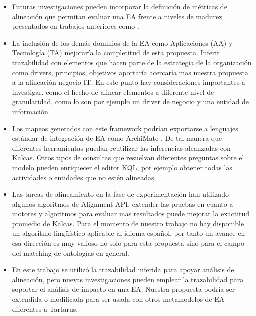 \begin{itemize}

\item Futuras investigaciones pueden incorporar la definici\'on de m\'etricas de alineaci\'on que permitan evaluar una EA frente a niveles de madurez presentados en trabajos anteriores como \cite{Elhari:2011}.

\item La inclusi\'on de los dem\'as dominios de la EA como Aplicaciones (AA) y Tecnolog\'ia (TA) mejorar\'ia la completitud de esta propuesta. Inferir trazabilidad con elementos que hacen parte de la estrategia de la organizaci\'on como drivers, principios, objetivos aportar\'ia acercar\'ia mas nuestra propuesta a la alineaci\'on negocio-IT. En este punto hay consideraciones importantes a investigar, como el hecho de alinear elementos a diferente nivel de granularidad, como lo son por ejemplo un driver de negocio y una entidad de informaci\'on.

\item Los mapeos generados con este framework podr\'ian exportarse a lenguajes est\'andar de integraci\'on de EA como ArchiMate \cite{Jonkers:2004}. De tal manera que diferentes herramientas puedan reutilizar las inferencias alcanzadas con Kalcas. Otros tipos de consultas que resuelvan diferentes preguntas sobre el modelo pueden enriquecer el editor KQL, por ejemplo obtener todas las actividades o entidades que no est\'en alineadas.

\item Las tareas de alineamiento en la fase de experimentaci\'on han utilizado algunos algoritmos de Alignment API, extender las pruebas en cuanto a motores y algoritmos para evaluar mas resultados puede mejorar la exactitud promedio de Kalcas. Para el momento de nuestro trabajo no hay disponible un algoritmo ling\"u\'istico aplicable al idioma espa\~nol, por tanto un avance en esa direcci\'on es muy valioso no solo para esta propuesta sino para el campo del matching de ontolog\'ias en general. 

\item En este trabajo se utiliz\'o la trazabilidad inferida para apoyar an\'alisis de alineaci\'on, pero nuevas investigaciones pueden emplear la trazabilidad para soportar el an\'alisis de impacto en una EA. Nuestra propuesta podr\'ia ser extendida o modificada para ser usada con otros metamodelos de EA diferentes a Tartarus.

\end{itemize}

